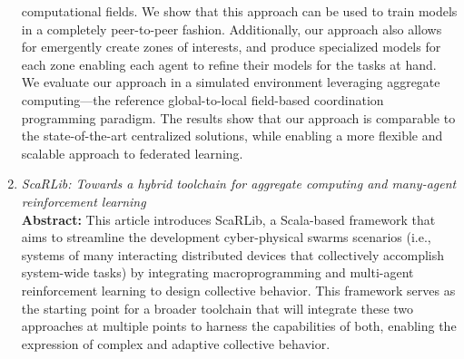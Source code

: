 \documentclass[runningheads]{llncs}
\begin{document}
\begin{enumerate}
     computational fields. 
    We show that this approach can be used to train models in a completely peer-to-peer fashion. 
    Additionally, our approach also allows for emergently create zones of interests, and produce specialized models for each zone enabling each agent 
     to refine their models for the tasks at hand.
    We evaluate our approach in a simulated environment leveraging aggregate computing—the reference global-to-local field-based coordination programming paradigm. 
    The results show that our approach is comparable to the state-of-the-art centralized solutions, while enabling a more flexible and scalable approach 
     to federated learning.
    \item \emph{ScaRLib: Towards a hybrid toolchain for aggregate computing and many-agent reinforcement learning}~\cite{DBLP:journals/scp/DominiCAV24} \\
    \textbf{Abstract: }
    This article introduces ScaRLib, a Scala-based framework that aims to streamline the development cyber-physical swarms scenarios 
     (i.e., systems of many interacting distributed devices that collectively accomplish system-wide tasks) by integrating macroprogramming and multi-agent 
     reinforcement learning to design collective behavior. 
     This framework serves as the starting point for a broader toolchain that will integrate these two approaches at multiple points to harness the 
     capabilities of both, enabling the expression of complex and adaptive collective behavior.


\end{enumerate}
\end{document}
